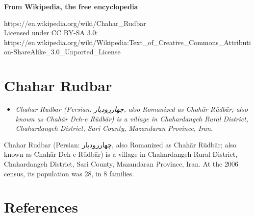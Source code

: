 \textbf{From Wikipedia, the free encyclopedia}

https://en.wikipedia.org/wiki/Chahar\_Rudbar\\
Licensed under CC BY-SA 3.0:\\
https://en.wikipedia.org/wiki/Wikipedia:Text\_of\_Creative\_Commons\_Attribution-ShareAlike\_3.0\_Unported\_License

\section{Chahar Rudbar}\label{chahar-rudbar}

\begin{itemize}
\item
  \emph{Chahar Rudbar (Persian: چهاررودبار‎, also Romanized as Chahār
  Rūdbār; also known as Chahār Deh-e Rūdbār) is a village in
  Chahardangeh Rural District, Chahardangeh District, Sari County,
  Mazandaran Province, Iran.}
\end{itemize}

Chahar Rudbar (Persian: چهاررودبار‎, also Romanized as Chahār Rūdbār;
also known as Chahār Deh-e Rūdbār) is a village in Chahardangeh Rural
District, Chahardangeh District, Sari County, Mazandaran Province, Iran.
At the 2006 census, its population was 28, in 8 families.

\section{References}\label{references}
